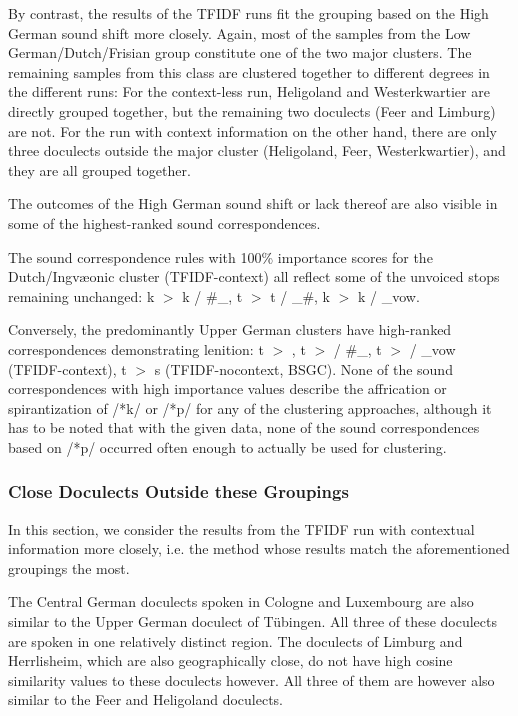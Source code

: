 \documentclass[a4paper]{article}
\begin{document}
By contrast, the results of the TFIDF runs fit
the grouping based on the High German sound shift more closely.
Again, most of the samples from the Low German/Dutch/Frisian group
constitute one of the two major clusters.
The remaining samples from this class are clustered together
to different degrees in the different runs:
For the context-less run,
Heligoland and Westerkwartier are directly grouped together,
but the remaining two doculects (Feer and Limburg) are not.
For the run with context information on the other hand,
there are only three doculects outside the major cluster
(Heligoland, Feer, Westerkwartier),
and they are all grouped together.

The outcomes of the High German sound shift or lack thereof
are also visible in some of the highest-ranked sound correspondences.

The sound correspondence rules with 100\% importance scores
for the Dutch/Ingv\ae{}onic cluster (TFIDF-context)
all reflect some of the unvoiced stops remaining unchanged:
k $>$ k / \#\_, t $>$ t / \_\#, k $>$ k / \_vow.

Conversely, the predominantly Upper German clusters
have high-ranked correspondences demonstrating lenition:
t $>$ , t $>$  / \#\_,
t $>$  / \_vow (TFIDF-context),
t $>$ s (TFIDF-nocontext, BSGC).
None of the sound correspondences with high importance values
describe the affrication or spirantization of /*k/ or /*p/
for any of the clustering approaches,
although it has to be noted that with the given data,
none of the sound correspondences based on /*p/
occurred often enough to actually be used for clustering.

\subsubsection{Close Doculects Outside these Groupings}

In this section, we consider the results from
the TFIDF run with contextual information more closely,
i.e. the method whose results match the aforementioned
groupings the most.


The Central German doculects spoken in Cologne and Luxembourg
are also similar to the Upper German doculect of T\"{u}bingen.
All three of these doculects are spoken in one relatively distinct %
region.
The doculects of Limburg and Herrlisheim,
which are also geographically close,
do not have high cosine similarity values to these doculects however.
All three of them are however also similar to the Feer and Heligoland doculects.
\end{document}
